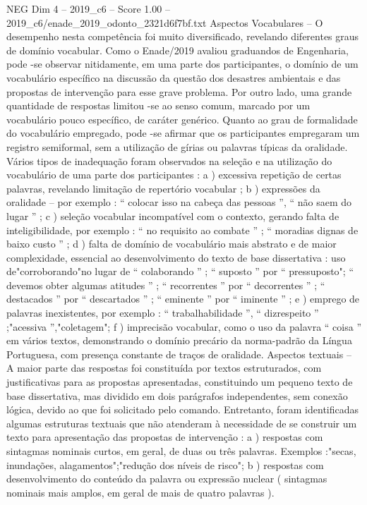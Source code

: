 \begin{textsample}{NEG Dim 4 – 2019\_c6 – Score 1.00 – 2019\_c6/enade\_2019\_odonto\_2321d6f7bf.txt}
Aspectos Vocabulares – O desempenho nesta competência foi muito diversificado, revelando diferentes graus de domínio vocabular.
Como o Enade/2019 avaliou graduandos de Engenharia, pode -se observar nitidamente, em uma parte dos participantes, o domínio de um vocabulário específico na discussão da questão dos desastres ambientais e das propostas de intervenção para esse grave problema.
Por outro lado, uma grande quantidade de respostas limitou -se ao senso comum, marcado por um vocabulário pouco específico, de caráter genérico.
Quanto ao grau de formalidade do vocabulário empregado, pode -se afirmar que os participantes empregaram um registro semiformal, sem a utilização de gírias ou palavras típicas da oralidade.
Vários tipos de inadequação foram observados na seleção e na utilização do vocabulário de uma parte dos participantes : a ) excessiva repetição de certas palavras, revelando limitação de repertório vocabular ; b ) expressões da oralidade – por exemplo : “ colocar isso na cabeça das pessoas ”, “ não saem do lugar ” ; c ) seleção vocabular incompatível com o contexto, gerando falta de inteligibilidade, por exemplo : “ no requisito ao combate ” ; “ moradias dignas de baixo custo ” ; d ) falta de domínio de vocabulário mais abstrato e de maior complexidade, essencial ao desenvolvimento do texto de base dissertativa : uso de"corroborando"no lugar de “ colaborando ” ; “ suposto ” por “ pressuposto"; “ devemos obter algumas atitudes ” ; “ recorrentes ” por “ decorrentes ” ; “ destacados ” por “ descartados ” ; “ eminente ” por “ iminente ” ; e ) emprego de palavras inexistentes, por exemplo : “ trabalhabilidade ”, “ dizrespeito ” ;"acessiva ”,"coletagem"; f ) imprecisão vocabular, como o uso da palavra “ coisa ” em vários textos, demonstrando o domínio precário da norma-padrão da Língua Portuguesa, com presença constante de traços de oralidade.
Aspectos textuais – A maior parte das respostas foi constituída por textos estruturados, com justificativas para as propostas apresentadas, constituindo um pequeno texto de base dissertativa, mas dividido em dois parágrafos independentes, sem conexão lógica, devido ao que foi solicitado pelo comando.
Entretanto, foram identificadas algumas estruturas textuais que não atenderam à necessidade de se construir um texto para apresentação das propostas de intervenção : a ) respostas com sintagmas nominais curtos, em geral, de duas ou três palavras.
Exemplos :"secas, inundações, alagamentos";"redução dos níveis de risco"; b ) respostas com desenvolvimento do conteúdo da palavra ou expressão nuclear ( sintagmas nominais mais amplos, em geral de mais de quatro palavras ).

\end{textsample}
